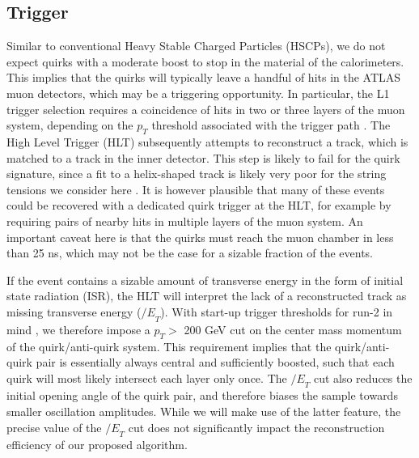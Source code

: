 \documentclass[10pt,aps,prd,nofootinbib,superscriptaddress,twocolumn,preprintnumbers,balancelastpage]{revtex4}
\newcommand{\MET}{{\slash\!\!\!\!E}_{T}}
\newcommand{\SK}[1]{\textcolor{ForestGreen}{\bf SK: #1}}
\newcommand{\TL}[1]{\textcolor{Purple}{\bf TL: #1}}
\begin{document}




\subsection{Trigger\label{sec:trigger}}
Similar to conventional Heavy Stable Charged Particles (HSCPs), we do not expect quirks with a moderate boost to stop in the material of the calorimeters. This implies that the quirks will typically leave a handful of hits in the ATLAS muon detectors, which may be a triggering opportunity. In particular, the L1 trigger selection requires a coincidence of hits in two or three layers of the muon system, depending on the $p_T$ threshold associated with the trigger path \cite{Aad:2014sca,ATL-DAQ-PUB-2016-001}. The High Level Trigger (HLT) subsequently attempts to reconstruct a track, which is matched to a track in the inner detector. This step is likely to fail for the quirk signature, since a fit to a helix-shaped track is likely very poor for the string tensions we consider here \cite{Farina:2017cts}.  It is however plausible that many of these events could be recovered with a dedicated quirk trigger at the HLT, for example by requiring pairs of nearby hits in multiple layers of the muon system. An important caveat here is that the quirks must reach the muon chamber in less than 25 ns, which may not be the case for a sizable fraction of the events.

If the event contains a sizable amount of transverse energy in the form of initial state radiation (ISR), the HLT will interpret the lack of a reconstructed track as missing transverse energy ($\MET$). With start-up trigger thresholds for run-2 in mind \cite{ATL-DAQ-PUB-2016-001}, we therefore impose a $p_T>$ 200 GeV cut on the center mass momentum of the quirk/anti-quirk system. This requirement implies that the quirk/anti-quirk pair is essentially always central and sufficiently boosted, such that each quirk will most likely intersect each layer only once. The $\MET$ cut also reduces the initial opening angle of the quirk pair, and therefore biases the sample towards smaller oscillation amplitudes. While we will make use of the latter feature, the precise value of the $\MET$ cut does not significantly impact the reconstruction efficiency of our proposed algorithm.
\end{document}
